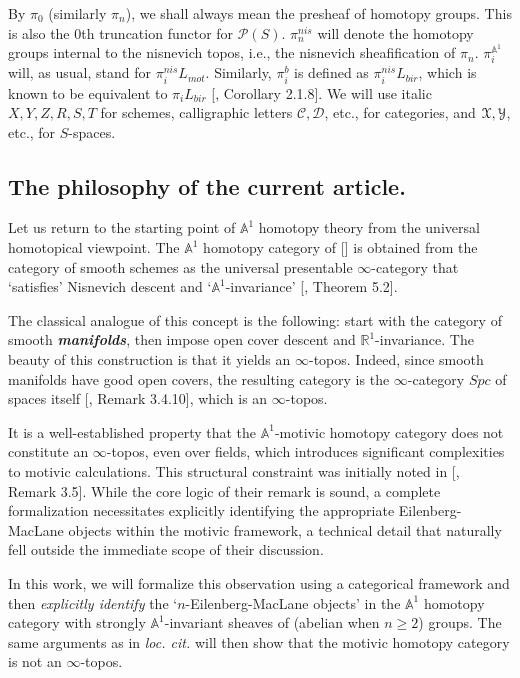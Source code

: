 By $\pi_0$ (similarly $\pi_n$), we shall always mean the presheaf of homotopy groups. This is also the $0$th truncation functor for $\mathcal{P}(S)$. $\pi_n^{nis}$ will denote the homotopy groups internal to the nisnevich topos, i.e., the nisnevich sheafification of $\pi_n$. $\pi_i^{\mathbb{A}^1}$ will, as usual, stand for $\pi_i^{nis}L_{mot}$. Similarly, $\pi_i^b$ is defined as $\pi_i^{nis}L_{bir}$, which is known to be equivalent to $\pi_iL_{bir}$ [\cite{0bat}, Corollary 2.1.8].
We will use italic $X,Y,Z, R,S,T$ for schemes, calligraphic letters $\mathcal{C},\mathcal{D}$, etc., for categories, and $\EuScript{X}, \EuScript{Y}$, etc., for $S$-spaces.

\subsection{The philosophy of the current article.}

Let us return to the starting point of $\mathbb{A}^1$ homotopy theory from the universal homotopical viewpoint. The $\mathbb{A}^1$ homotopy category of [\cite{morel19991}] is obtained from the category of smooth schemes as the universal presentable $\infty$-category that `satisfies' Nisnevich descent and `$\mathbb{A}^1$-invariance' [\cite{robalo2012noncommutative}, Theorem 5.2].  

The classical analogue of this concept is the following: start with the category of smooth \textbf{\textit{manifolds}}, then impose open cover descent and $\mathbb{R}^1$-invariance. The beauty of this construction is that it yields an $\infty$-topos. Indeed, since smooth manifolds have good open covers, the resulting category is the $\infty$-category $Spc$ of spaces itself [\cite{dugger1999sheaves}, Remark 3.4.10], which is an $\infty$-topos.  

It is a well-established property that the $\mathbb{A}^1$-motivic homotopy category does not constitute an $\infty$-topos, even over fields, which introduces significant complexities to motivic calculations. This structural constraint was initially noted in [\cite{spitzweck2012motivic}, Remark 3.5]. While the core logic of their remark is sound, a complete formalization necessitates explicitly identifying the appropriate Eilenberg-MacLane objects within the motivic framework, a technical detail that naturally fell outside the immediate scope of their discussion. 

In this work, we will formalize this observation using a categorical framework and then \textit{explicitly identify} the `$n$-Eilenberg-MacLane objects' in the $\mathbb{A}^1$ homotopy category with strongly $\mathbb{A}^1$-invariant sheaves of (abelian when $n\geq 2$) groups. The same arguments as in \textit{loc. cit.} will then show that the motivic homotopy category is not an $\infty$-topos.

